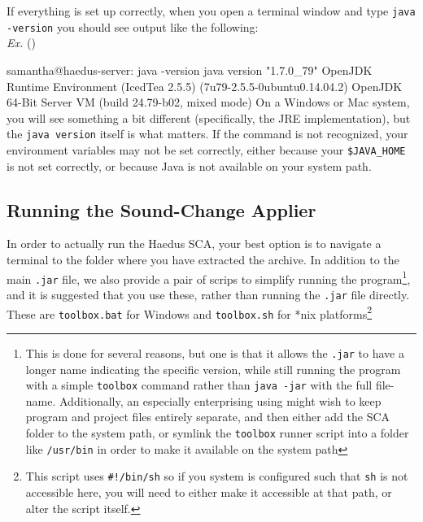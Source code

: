 \documentclass[10pt,letterpaper]{article}
\newcounter{excounter}
\newenvironment{vex}[1]{
	\refstepcounter{excounter}
	\noindent\emph{Ex.} (\arabic{excounter}\label{#1})
	\verbatim
}{\endverbatim}
\begin{document}
If everything is set up correctly, when you open a terminal window and type \texttt{java -version} you should see output like the following:\\
\begin{vex}{ex:javatest}
samantha@haedus-server: java -version
java version "1.7.0_79"
OpenJDK Runtime Environment (IcedTea 2.5.5) (7u79-2.5.5-0ubuntu0.14.04.2)
OpenJDK 64-Bit Server VM (build 24.79-b02, mixed mode)
\end{vex} 
\noindent
On a Windows or Mac system, you will see something a bit different (specifically, the JRE implementation), but the \texttt{java version} itself is what matters. If the command is not recognized, your environment variables may not be set correctly, either because your \texttt{\$JAVA\_HOME} is not set correctly, or because Java is not available on your system path.

\subsection{Running the Sound-Change Applier}\label{sec:runningsca}
In order to actually run the Haedus SCA, your best option is to navigate a terminal to the folder where you have extracted the archive.
In addition to the main \texttt{.jar} file, we also provide a pair of scrips to simplify running the program\footnote{This is done for several reasons, but one is that it allows the \texttt{.jar} to have a longer name indicating the specific version, while still running the program with a simple \texttt{toolbox} command rather than \texttt{java -jar} with the full file-name. Additionally, an especially enterprising using might wish to keep program and project files entirely separate, and then either add the SCA folder to the system path, or symlink the \texttt{toolbox} runner script into a folder like \texttt{/usr/bin} in order to make it available on the system path}, and it is suggested that you use these, rather than running the \texttt{.jar} file directly. These are \texttt{toolbox.bat} for Windows and \texttt{toolbox.sh} for *nix platforms\footnote{This script uses \texttt{\#!/bin/sh} so if you system is configured such that \texttt{sh} is not accessible here, you will need to either make it accessible at that path, or alter the script itself.}

\end{document}
